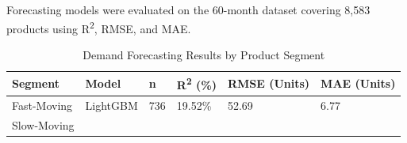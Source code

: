 \documentclass[12pt,a4paper,oneside]{report}
\begin{document}
Forecasting models were evaluated on the 60-month dataset covering 8,583
products using R\textsuperscript{2}, RMSE, and MAE.

\begin{longtable}[]{@{}
  >{\raggedright\arraybackslash}p{}
  >{\raggedright\arraybackslash}p{}
  >{\raggedright\arraybackslash}p{}
  >{\raggedright\arraybackslash}p{}
  >{\raggedright\arraybackslash}p{}
  >{\raggedright\arraybackslash}p{}@{}}
\caption{Demand Forecasting Results by Product Segment\label{tab:table20}}\\
\toprule
\textbf{Segment} & \textbf{Model} & \textbf{n} & \textbf{R\textsuperscript{2} (\%)} & \textbf{RMSE (Units)} & \textbf{MAE (Units)} \\
\midrule
\toprule\noalign{}
\begin{minipage}[b]{\linewidth}\centering
Fast-Moving
\end{minipage} & \begin{minipage}[b]{\linewidth}\raggedright

LightGBM

\end{minipage} & \begin{minipage}[b]{\linewidth}\centering

736

\end{minipage} & \begin{minipage}[b]{\linewidth}\raggedright

19.52\%

\end{minipage} & \begin{minipage}[b]{\linewidth}\raggedright

52.69

\end{minipage} & \begin{minipage}[b]{\linewidth}\centering

6.77

\end{minipage} \\
\begin{minipage}[b]{\linewidth}\centering

Slow-Moving

\end{minipage} & \begin{minipage}[b]{\linewidth}\raggedright


\end{minipage}
\end{longtable}
\end{document}
